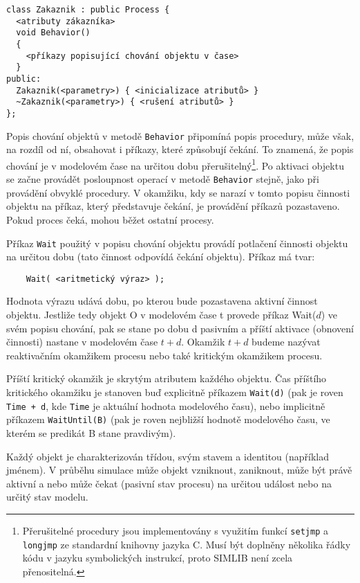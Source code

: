 \documentclass[a4paper]{article}
\begin{document}
\begin{verbatim}
class Zakaznik : public Process {
  <atributy zákazníka>
  void Behavior()
  {
    <příkazy popisující chování objektu v čase>
  }
public:
  Zakaznik(<parametry>) { <inicializace atributů> }
  ~Zakaznik(<parametry>) { <rušení atributů> }
};
\end{verbatim}

Popis chování objektů v metodě \verb|Behavior| připomíná popis procedury, může však,
na rozdíl od ní, obsahovat i příkazy, které způsobují čekání. To znamená, že
popis chování je v modelovém čase na určitou dobu
přerušitelný\footnote{Přerušitelné procedury jsou implementovány s využitím
funkcí \texttt{setjmp} a \texttt{longjmp} ze standardní knihovny jazyka C. Musí být doplněny
několika řádky kódu v jazyku symbolických instrukcí, proto SIMLIB není zcela
přenositelná.}. Po aktivaci objektu se začne provádět posloupnost operací v
metodě \verb|Behavior| stejně, jako při provádění obvyklé procedury. V okamžiku, kdy
se narazí v tomto popisu činnosti objektu na příkaz, který představuje
čekání, je provádění příkazů pozastaveno. Pokud proces čeká, mohou běžet
ostatní procesy.

Příkaz \verb|Wait| použitý v popisu chování objektu provádí potlačení
činnosti objektu na určitou dobu (tato činnost odpovídá čekání
objektu). Příkaz má tvar:

\begin{verbatim}
    Wait( <aritmetický výraz> );
\end{verbatim}

Hodnota výrazu udává dobu, po kterou bude pozastavena aktivní
činnost objektu. Jestliže tedy objekt O v modelovém čase
t provede příkaz Wait($d$) ve svém popisu chování, pak se stane
po dobu d pasivním a příští aktivace (obnovení činnosti) nastane
v modelovém čase $t + d$. Okamžik $t + d$ budeme nazývat
reaktivačním okamžikem procesu nebo také kritickým okamžikem
procesu.

Příští kritický okamžik je skrytým atributem každého objektu.
Čas příštího kritického okamžiku je stanoven buď explicitně
příkazem \verb|Wait(d)| (pak je roven \verb|Time + d|,
kde \verb|Time| je
aktuální hodnota modelového času), nebo implicitně příkazem
\verb|WaitUntil(B)| (pak je roven nejbližší hodnotě modelového času,
ve kterém se predikát B stane pravdivým).

Každý objekt je charakterizován třídou, svým stavem a identitou
(například jménem). V průběhu simulace může objekt vzniknout,
zaniknout, může být právě aktivní a nebo může čekat (pasivní
stav procesu) na určitou událost nebo na určitý stav modelu.
\end{document}
